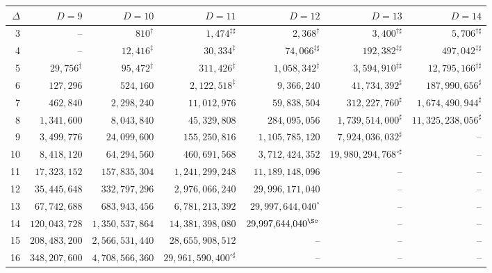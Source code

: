 \documentclass[11pt]{amsart}
\theoremstyle{definition}
\theoremstyle{remark}
\begin{document}
\begin{table}[ht]
\centering\footnotesize
\setlength{\tabcolsep}{4pt}
\begin{tabular}{@{}r*{6}{r}@{}}
\toprule
$\Delta$ & $D=9$ & $D=10$ & $D=11$ & $D=12$ & $D=13$ & $D=14$\\
\midrule
3 & -- & $810^{\dagger}$ & $1{,}474^{\ddagger\sharp}$ & $2{,}368^{\dagger}$ & $3{,}400^{\dagger\sharp}$ & $5{,}706^{\dagger\sharp}$\\
4 & -- & $12{,}416^{\ddagger}$ & $30{,}334^{\ddagger}$ & $74{,}066^{\ddagger\sharp}$ & $192{,}382^{\ddagger\sharp}$ & $497{,}042^{\ddagger\sharp}$\\
5 & $29{,}756^{\ddagger}$ & $95{,}472^{\ddagger}$ & $311{,}426^{\ddagger}$ & $1{,}058{,}342^{\ddagger}$ & $3{,}594{,}910^{\ddagger\sharp}$ & $12{,}795{,}166^{\ddagger\sharp}$\\
6 & $127{,}296$ & $524{,}160$ & $2{,}122{,}518^{\ddagger}$ & $9{,}366{,}240$ & $41{,}734{,}392^{\sharp}$ & $187{,}990{,}656^{\sharp}$\\
7 & $462{,}840$ & $2{,}298{,}240$ & $11{,}012{,}976$ & $59{,}838{,}504$ & $312{,}227{,}760^{\sharp}$ & $1{,}674{,}490{,}944^{\sharp}$\\
8 & $1{,}341{,}600$ & $8{,}043{,}840$ & $45{,}329{,}808$ & $284{,}095{,}056$ & $1{,}739{,}514{,}000^{\sharp}$ & $11{,}325{,}238{,}056^{\sharp}$\\
9 & $3{,}499{,}776$ & $24{,}099{,}600$ & $155{,}250{,}816$ & $1{,}105{,}785{,}120$ & $7{,}924{,}036{,}032^{\sharp}$ & --\\
10 & $8{,}418{,}120$ & $64{,}294{,}560$ & $460{,}691{,}568$ & $3{,}712{,}424{,}352$ & $19{,}980{,}294{,}768^{\circ\sharp}$ & --\\
11 & $17{,}323{,}152$ & $157{,}835{,}304$ & $1{,}241{,}299{,}248$ & $11{,}189{,}148{,}096$ & -- & --\\
12 & $35{,}445{,}648$ & $332{,}797{,}296$ & $2{,}976{,}066{,}240$ & $29{,}996{,}171{,}040$ & -- & --\\
13 & $67{,}742{,}688$ & $683{,}943{,}456$ & $6{,}781{,}213{,}392$ & $29{,}997{,}644{,}040^{\circ}$ & -- & --\\
14 & $120{,}043{,}728$ & $1{,}350{,}537{,}864$ & $14{,}381{,}398{,}080$ & $29{,}997{,}644{,}040^{\S\circ}$ & -- & --\\
15 & $208{,}483{,}200$ & $2{,}566{,}531{,}440$ & $28{,}655{,}908{,}512$ & -- & -- & --\\
16 & $348{,}207{,}600$ & $4{,}708{,}566{,}360$ & $29{,}961{,}590{,}400^{\circ\sharp}$ & -- & -- & --\\

\end{tabular}
\end{table}
\end{document}
